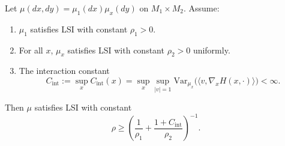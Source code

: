 \begin{theorem}\label{thm:interaction-tensorization}
Let $\mu(dx,dy) = \mu_1(dx) \mu_x(dy)$ on $M_1 \times M_2$. Assume:
\begin{enumerate}
    \item $\mu_1$ satisfies LSI with constant $\rho_1 > 0$.
    \item For all $x$, $\mu_x$ satisfies LSI with constant $\rho_2 > 0$ uniformly.
    \item The interaction constant 
    \begin{equation}
        C_{\mathrm{int}} := \sup_x C_{\mathrm{int}}(x) = \sup_x \sup_{|v|=1} \mathrm{Var}_{\mu_x}\big(\langle v, \nabla_x H(x,\cdot) \rangle\big) < \infty.
    \end{equation}
\end{enumerate}
Then $\mu$ satisfies LSI with constant
\begin{equation}
    \rho \geq \left( \frac{1}{\rho_1} + \frac{1 + C_{\mathrm{int}}}{\rho_2} \right)^{-1}.
\end{equation}
\end{theorem}

